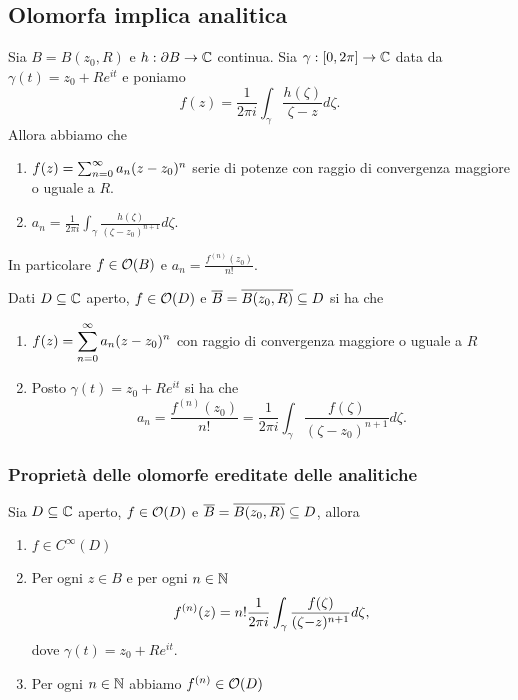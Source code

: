 \begin{multicols*}{2}
\subsection{Olomorfa implica analitica}
\begin{theorem}\label{ContinueSuBordoDiDiscoDefinisconoOlomorfaInDisco}
Sia $B=B(z_0,R)$ e $h:\partial B\to \mathbb{C}$ continua. Sia $\gamma:[0,2\pi]\to \mathbb{C}$ data da $\gamma(t)=z_0+Re^{it}$ e poniamo
\[f(z)=\frac1{2\pi i}\int_{\gamma}\frac{h(\zeta)}{\zeta-z}d\zeta.\]
Allora abbiamo che
\begin{enumerate}[noitemsep]
\item $f(z)=\sum_{n=0}^\infty a_n(z-z_0)^n$ serie di potenze con raggio di convergenza maggiore o uguale a $R$.
\item $a_n=\displaystyle\frac1{2\pi i}\int_\gamma\frac{h(\zeta)}{(\zeta-z_0)^{n+1}}d\zeta$.
\end{enumerate}
In particolare $f\in \mathcal{O}(B)$ e $a_n=\frac{f^{(n)}(z_0)}{n!}$.
\end{theorem}


\begin{corollary}\label{OlomorfaImplicaAnalitica}
Dati $D\subseteq \mathbb{C}$ aperto, $f\in \mathcal{O}(D)$ e $\overline{B}=\overline{B(z_0,R)}\subseteq D$ si ha che
\begin{enumerate}[noitemsep]
\item $\displaystyle f(z)=\sum_{n=0}^\infty a_n(z-z_0)^n$ con raggio di convergenza maggiore o uguale a $R$
\item Posto $\gamma(t)=z_0+Re^{it}$ si ha che \[a_n=\frac{f^{(n)}(z_0)}{n!}=\frac1{2\pi i}\int_{\gamma}\frac{f(\zeta)}{(\zeta-z_0)^{n+1}}d\zeta.\]
\end{enumerate}
\end{corollary}

\subsubsection{Propriet\`a delle olomorfe ereditate delle analitiche}
\begin{corollary}\label{ProprietaCheOlomorfeEreditanoDaAnalitiche}
Sia $D\subseteq \mathbb{C}$ aperto, $f\in \mathcal{O}(D)$ e $\overline{B}=\overline{B(z_0,R)}\subseteq D$, allora
\begin{enumerate}[noitemsep]
\item $f\in C^\infty(D)$
\item Per ogni $z\in B$ e per ogni $n\in \mathbb{N}$
\[f^{(n)}(z)=n!\cauchyint[n+1]<-z>{\gamma},\]
dove $\gamma(t)=z_0+Re^{it}$.
\item Per ogni $n\in\mathbb{N}$ abbiamo $f^{(n)}\in \mathcal{O}(D)$
\end{enumerate}
\end{corollary}



\end{multicols*}
